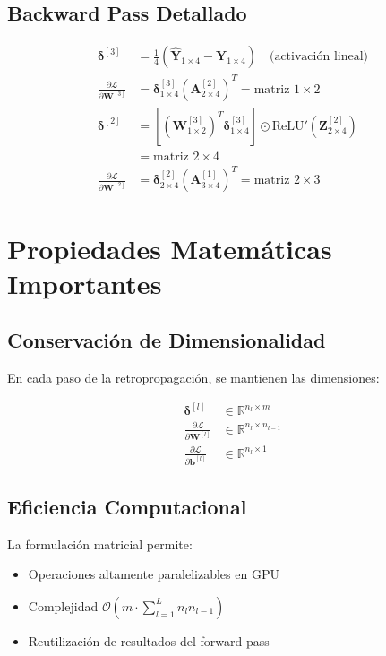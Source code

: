 \documentclass[12pt]{article}
\begin{document}
\subsection{Backward Pass Detallado}

\begin{align}
\boldsymbol{\delta}^{[3]} &= \frac{1}{4} (\hat{\mathbf{Y}}_{1 \times 4} - \mathbf{Y}_{1 \times 4}) \quad \text{(activación lineal)} \\
\frac{\partial \mathcal{L}}{\partial \mathbf{W}^{[3]}} &= \boldsymbol{\delta}^{[3]}_{1 \times 4} (\mathbf{A}^{[2]}_{2 \times 4})^T = \text{matriz } 1 \times 2 \\
\boldsymbol{\delta}^{[2]} &= \left[(\mathbf{W}^{[3]}_{1 \times 2})^T \boldsymbol{\delta}^{[3]}_{1 \times 4}\right] \odot \text{ReLU}'(\mathbf{Z}^{[2]}_{2 \times 4}) \\
&= \text{matriz } 2 \times 4 \\
\frac{\partial \mathcal{L}}{\partial \mathbf{W}^{[2]}} &= \boldsymbol{\delta}^{[2]}_{2 \times 4} (\mathbf{A}^{[1]}_{3 \times 4})^T = \text{matriz } 2 \times 3
\end{align}

\section{Propiedades Matemáticas Importantes}

\subsection{Conservación de Dimensionalidad}

En cada paso de la retropropagación, se mantienen las dimensiones:

\begin{align}
\boldsymbol{\delta}^{[l]} &\in \mathbb{R}^{n_l \times m} \\
\frac{\partial \mathcal{L}}{\partial \mathbf{W}^{[l]}} &\in \mathbb{R}^{n_l \times n_{l-1}} \\
\frac{\partial \mathcal{L}}{\partial \mathbf{b}^{[l]}} &\in \mathbb{R}^{n_l \times 1}
\end{align}

\subsection{Eficiencia Computacional}

La formulación matricial permite:

\begin{itemize}
\item Operaciones altamente paralelizables en GPU
\item Complejidad $\mathcal{O}(m \cdot \sum_{l=1}^L n_l n_{l-1})$
\item Reutilización de resultados del forward pass
\end{itemize}
\end{document}
